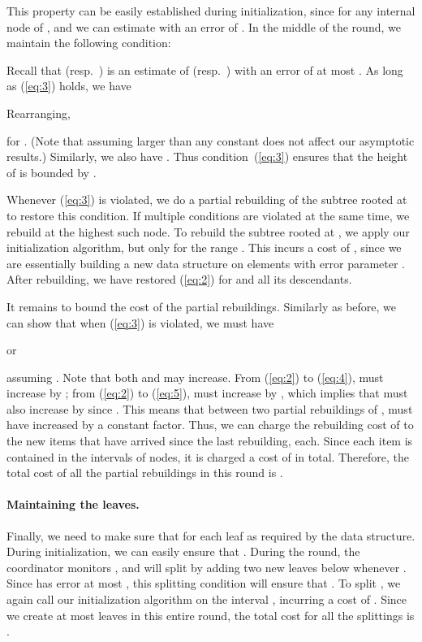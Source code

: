 \documentclass[10pt]{article}
\begin{document}
This property can be easily established during initialization, since  for any internal node  of , and we can
estimate  with an error of .  In the middle
of the round, we maintain the following condition:

Recall that  (resp.\ ) is an estimate of  (resp.\
) with an error of at most .  As long as
(\ref{eq:3}) holds, we have

Rearranging,

for . (Note that assuming  larger than any constant does not
affect our asymptotic results.)  Similarly, we also have .  Thus condition~(\ref{eq:3}) ensures that the
height of  is bounded by .

Whenever (\ref{eq:3}) is violated, we do a partial rebuilding of the
subtree rooted at  to restore this condition.  If multiple conditions
are violated at the same time, we rebuild at the highest such node.  To
rebuild the subtree rooted at , we apply our initialization algorithm,
but only for the range .  This incurs a cost of , since we are essentially building a new data structure
on  elements with error parameter .  After rebuilding, we have restored (\ref{eq:2}) for  and all its
descendants.

It remains to bound the cost of the partial rebuildings.  Similarly as
before, we can show that when (\ref{eq:3}) is violated, we must have

or

assuming .  Note that both  and  may
increase.  From (\ref{eq:2}) to (\ref{eq:4}),  must increase
by ; from (\ref{eq:2}) to
(\ref{eq:5}),  must increase by , which
implies that  must also increase by 
since .  This means that between two partial rebuildings
of ,  must have increased by a constant factor.  Thus, we
can charge the rebuilding cost of  to the  new
items that have arrived since the last rebuilding,   each.
Since each item is contained in the intervals of  nodes, it is
charged a cost of  in total.  Therefore, the total cost of
all the partial rebuildings in this round is .

\paragraph{Maintaining the leaves.}
Finally, we need to make sure that  for
each leaf  as required by the data structure.  During initialization, we
can easily ensure that .  During the round, the coordinator monitors , and
will split  by adding two new leaves below  whenever .  Since  has error at most , this
splitting condition will ensure that .
To split , we again call our initialization algorithm on the interval
, incurring a cost of .  Since
we create at most  leaves in this entire round, the total cost
for all the splittings is .
\end{document}
